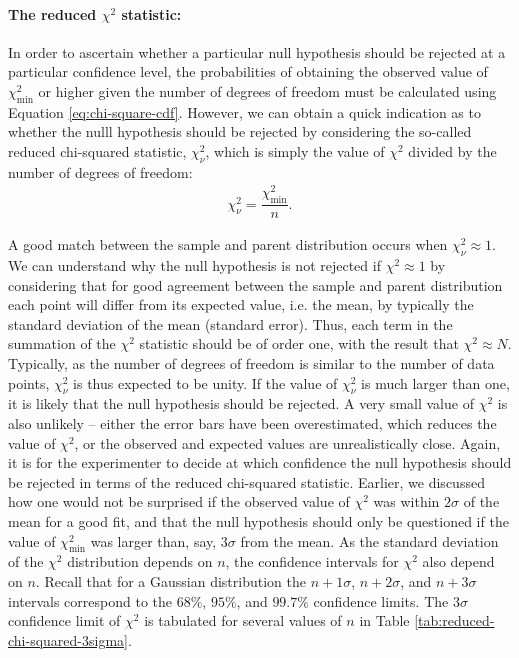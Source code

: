 \paragraph{The reduced $\chi^2$ statistic:} In order to ascertain whether a particular null hypothesis should be rejected at a particular confidence level, the probabilities of obtaining the observed value of $\chi^2_\mathrm{min}$ or higher given the number of degrees of freedom must be calculated using Equation \ref{eq:chi-square-cdf}. However, we can obtain a quick indication as to whether the nulll hypothesis should be rejected by considering the so-called reduced chi-squared statistic, $\chi^2_\nu$, which is simply the value of $\chi^2$ divided by the number of degrees of freedom:
\begin{align}
	\chi^2_\nu = \dfrac{\chi^2_\mathrm{min}}{n}.
\end{align} 

A good match between the sample and parent distribution occurs when $\chi^2_\nu \approx 1$. We can understand why the null hypothesis is not rejected if $\chi^2 \approx 1$ by considering that for good agreement between the sample and parent distribution each point will differ from its expected value, i.e. the mean, by typically the standard deviation of the mean (standard error). Thus, each term in the summation of the $\chi^2$ statistic should be of order one, with the result that $\chi^2\approx N$. Typically, as the number of degrees of freedom is similar to the number of data points, $\chi^2_\nu$ is thus expected to be unity. If the value of $\chi^2_\nu$ is much larger than one, it is likely that the null hypothesis should be rejected. A very small value of $\chi^2$ is also unlikely -- either the error bars have been overestimated, which reduces the value of $\chi^2$, or the observed and expected values are unrealistically close. Again, it is for the experimenter to decide at which confidence the null hypothesis should be rejected in terms of the reduced chi-squared statistic. Earlier, we discussed how one would not be surprised if the observed value of $\chi^2$ was within $2 \sigma$ of the mean for a good fit, and that the null hypothesis should only be questioned if the value of $\chi^2_\mathrm{min}$ was larger than, say, $3\sigma$ from the mean. As the standard deviation of the $\chi^2$ distribution depends on $n$, the confidence intervals for $\chi^2$ also depend on $n$. Recall that for a Gaussian distribution the $n+1\sigma$, $n+2 \sigma$, and $n+3 \sigma$ intervals correspond to the $68\%$, $95\%$, and $99.7\%$ confidence limits. The $3\sigma$ confidence limit of $\chi^2$ is tabulated for several values of $n$ in Table \ref{tab:reduced-chi-squared-3sigma}.

